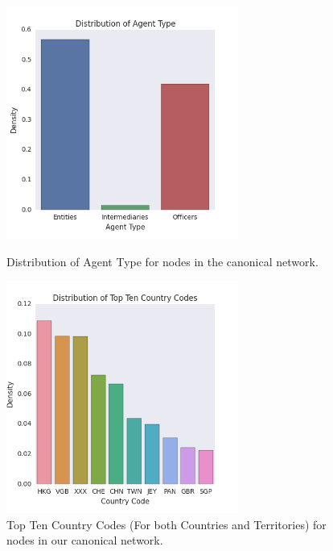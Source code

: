 \documentclass[11pt]{article}
\begin{document}
\begin{figure}[H]
\centering
\begin{minipage}{.5\textwidth}
  \centering
  \includegraphics[width=3in]{figures/figure3.png}
  \caption{Distribution of Agent Type for nodes in the canonical network.}
  \label{fig3}
\end{minipage}%
\begin{minipage}{.5\textwidth}
  \centering
  \includegraphics[width=3in]{figures/figure4.png}
  \caption{Top Ten Country Codes (For both Countries and Territories) for
                nodes in our canonical network.}
  \label{fig4}
\end{minipage}
\end{figure}
\end{document}
